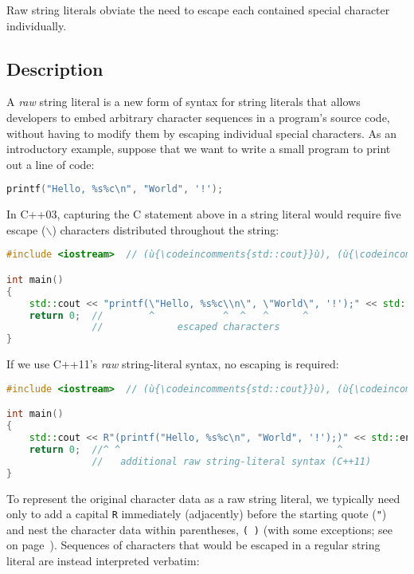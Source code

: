 

Raw string literals obviate the need to escape each contained special
character individually.

\subsection[Description]{Description}\label{description}

A \emph{raw} string literal is a new form of syntax for string literals
that allows developers to embed arbitrary character sequences in a
program's source code, without having to modify them by escaping
individual special characters. As an introductory example, suppose that
we want to write a small program to print out a line of code:

\begin{lstlisting}[language=C++]
printf("Hello, %s%c\n", "World", '!');
\end{lstlisting}

\noindent In C++03, capturing the C statement above in a string literal would
require five escape (\texttt{$\backslash$}) characters distributed
throughout the string:

\begin{lstlisting}[language=C++]
#include <iostream>  // (ù{\codeincomments{std::cout}}ù), (ù{\codeincomments{std::endl}}ù)

int main()
{
    std::cout << "printf(\"Hello, %s%c\\n\", \"World\", '!');" << std::endl;
    return 0;  //        ^            ^  ^   ^      ^
               //             escaped characters
}
\end{lstlisting}

\noindent If we use C++11's \emph{raw} string-literal syntax, no escaping is
required:

\begin{lstlisting}[language=C++]
#include <iostream>  // (ù{\codeincomments{std::cout}}ù), (ù{\codeincomments{std::endl}}ù)

int main()
{
    std::cout << R"(printf("Hello, %s%c\n", "World", '!');)" << std::endl;
    return 0;  //^ ^                                      ^
               //   additional raw string-literal syntax (C++11)
}
\end{lstlisting}

\noindent To represent the original character
data as a raw string literal, we typically need only to add a capital \texttt{R} immediately
(adjacently) before the starting quote (\texttt{"}) and nest the
character data within parentheses, \texttt{(}~\texttt{)} (with some exceptions; see \textit{} on page~\pageref{collisions}). Sequences of
characters that would be escaped in a regular string literal are instead
interpreted verbatim:


